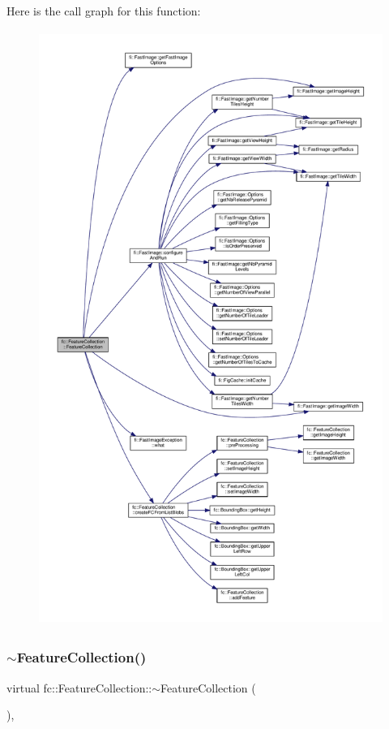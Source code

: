 Here is the call graph for this function\+:
\nopagebreak
\begin{figure}[H]
\begin{center}
\leavevmode
\includegraphics[height=550pt]{d9/d78/classfc_1_1FeatureCollection_acc38a1542fc4dc04175961140677ac51_cgraph}
\end{center}
\end{figure}
\mbox{\label{classfc_1_1FeatureCollection_abd2b7140fdf0ccd6cee9234ad932c973}} 
\subsubsection{\texorpdfstring{$\sim$\+Feature\+Collection()}{~FeatureCollection()}}
{\footnotesize\ttfamily virtual fc\+::\+Feature\+Collection\+::$\sim$\+Feature\+Collection (\begin{DoxyParamCaption}{ }\end{DoxyParamCaption})\hspace{0.3cm}{\ttfamily [inline]}, {\ttfamily [virtual]}}



